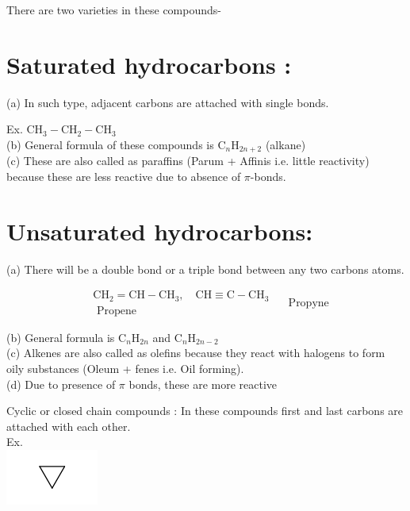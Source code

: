 \documentclass[10pt]{article}
\begin{document}
There are two varieties in these compounds-

\section*{Saturated hydrocarbons :}
(a) In such type, adjacent carbons are attached with single bonds.

Ex. $\mathrm{CH}_{3}-\mathrm{CH}_{2}-\mathrm{CH}_{3}$\\
(b) General formula of these compounds is $\mathrm{C}_{n} \mathrm{H}_{2 n+2}$ (alkane)\\
(c) These are also called as paraffins (Parum + Affinis i.e. little reactivity) because these are less reactive due to absence of $\pi$-bonds.

\section*{Unsaturated hydrocarbons:}
(a) There will be a double bond or a triple bond between any two carbons atoms.

$$
\begin{aligned}
& \mathrm{CH}_{2}=\mathrm{CH}-\mathrm{CH}_{3}, \quad \mathrm{CH} \equiv \mathrm{C}-\mathrm{CH}_{3} \\
& \text { Propene }
\end{aligned} \quad \text { Propyne }
$$

(b) General formula is $\mathrm{C}_{n} \mathrm{H}_{2 n}$ and $\mathrm{C}_{n} \mathrm{H}_{2 n-2}$\\
(c) Alkenes are also called as olefins because they react with halogens to form oily substances (Oleum + fenes i.e. Oil forming).\\
(d) Due to presence of $\pi$ bonds, these are more reactive

Cyclic or closed chain compounds : In these compounds first and last carbons are attached with each other.\\
Ex.\\
\includegraphics{smile-e7e535da4867be6021ec01f95784b3fbb92929db}
\end{document}
